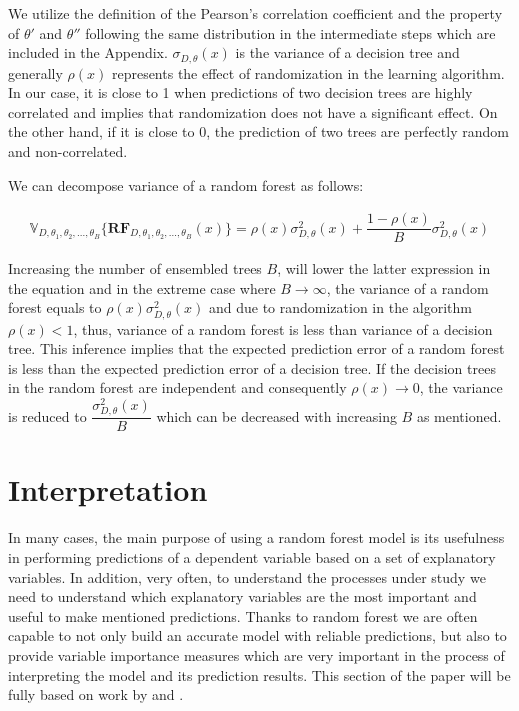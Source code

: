 We utilize the definition of the Pearson's correlation coefficient and the property of $\theta'$ and $\theta''$ following 
the same distribution in the intermediate steps which are included in the Appendix. $\sigma_{D, \theta}(x)$ is the 
variance of a decision tree and generally $\rho(x)$ represents the effect of randomization in the learning algorithm. 
In our case, it is close to 1 when predictions of two decision trees are highly correlated and implies that randomization 
does not have a significant effect. On the other hand, if it is close to 0, the prediction of two trees are perfectly random 
and non-correlated.

We can decompose variance of a random forest as follows:

\begin{align}\label{eq:decomp_var}
\mathbb{V}_{D, \theta_{1}, \theta_{2},..., \theta_{B}}\{\boldsymbol{RF}_{D, \theta_{1},\theta_{2},..., \theta_{B}}(x) \}  = \rho(x)\sigma^2_{D,\theta}(x) + \dfrac{1-\rho(x)}{B}\sigma^2_{D,\theta}(x)
\end{align}

Increasing the number of ensembled trees $B$, will lower the latter expression in the equation and in the extreme 
case where $B \rightarrow \infty $, the variance of a random forest equals to $\rho(x)\sigma^2_{D,\theta}(x)$ 
and due to randomization in the algorithm $\rho(x) < 1$, thus, variance of a random forest is less than variance of a 
decision tree. This inference implies that the expected prediction error of a random forest is less than the expected 
prediction error of a decision tree. If the decision trees in the random forest are independent 
and consequently $\rho(x) \rightarrow 0$, the variance is reduced to $\dfrac{\sigma^2_{D,\theta}(x)}{B}$ 
which can be decreased with increasing $B$ as mentioned.



\section{Interpretation}
In many cases, the main purpose of using a random forest model is its usefulness in performing predictions of a dependent variable
based on a set of explanatory variables. In addition, very often, to understand the processes under study we need to understand
which explanatory variables are the most important and useful to make mentioned predictions. 
Thanks to random forest we are often capable to not only build an accurate model with reliable predictions, 
but also to provide variable importance measures which are very important in the process of interpreting the model and 
its prediction results. This section of the paper will be fully based on work by \cite{louppe2013understanding}  and \cite{gerard2016foresttour}.

